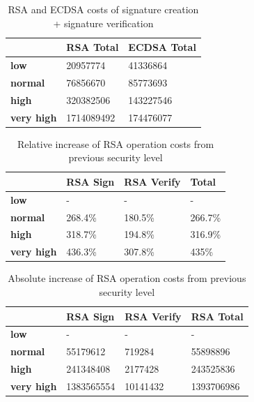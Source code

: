 \documentclass{llncs}
\begin{document}
\begin{table}[]
  \begin{tabular}{|l|l|l|}
                     & \textbf{RSA Total} & \textbf{ECDSA Total} \\ \hline
  \textbf{low}       & 20957774           & 41336864             \\ \hline
  \textbf{normal}    & 76856670           & 85773693             \\ \hline
  \textbf{high}      & 320382506          & 143227546            \\ \hline
  \textbf{very high} & 1714089492         & 174476077           
  \end{tabular}
  \centering \caption{\label{table:rsa-costs-all-sls-total} RSA and ECDSA costs of signature creation + signature verification}
\end{table}

\begin{table}[]
\begin{tabular}{|l|l|l|l|}
                   & \textbf{RSA Sign} & \textbf{RSA Verify} & \textbf{Total} \\ \hline
\textbf{low}       & -                 & -                   & -              \\ \hline
\textbf{normal}    & 268.4\%           & 180.5\%             & 266.7\%        \\ \hline
\textbf{high}      & 318.7\%           & 194.8\%             & 316.9\%        \\ \hline
\textbf{very high} & 436.3\%           & 307.8\%             & 435\%          \\ \hline
\end{tabular}
\centering \caption{\label{table:rsa-pub-priv-cost-increasee} Relative increase of RSA operation costs from previous security level}
\end{table}

\begin{table}[]
  \begin{tabular}{|l|l|l|l|}
  \hline
                     & \textbf{RSA Sign} & \textbf{RSA Verify} & \textbf{RSA Total} \\ \hline
  \textbf{low}       & -                 & -                   & -                  \\ \hline
  \textbf{normal}    & 55179612          & 719284              & 55898896           \\ \hline
  \textbf{high}      & 241348408         & 2177428             & 243525836          \\ \hline
  \textbf{very high} & 1383565554        & 10141432            & 1393706986         \\ \hline
  \end{tabular}
  \centering \caption{\label{table:rsa-absolute-cost-increase} Absolute increase of RSA operation costs from previous security level}
  \end{table}
\end{document}
